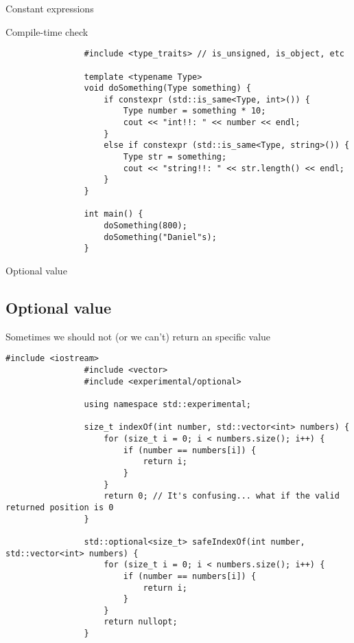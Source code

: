 \documentclass{beamer}
\newcommand{\normalSizeItem}[1] {
  \normalsize{\item #1}
}
\begin{document}
		\begin{frame}[fragile]{Constant expressions }	
			\begin{itemize}
				\normalSizeItem { Compile-time check }
				\begin{lstlisting}
				#include <type_traits> // is_unsigned, is_object, etc
				
				template <typename Type>
				void doSomething(Type something) {	
					if constexpr (std::is_same<Type, int>()) {
						Type number = something * 10;
						cout << "int!!: " << number << endl;
					}
					else if constexpr (std::is_same<Type, string>()) {
						Type str = something;
						cout << "string!!: " << str.length() << endl;
					}
				}
	
				int main() {
					doSomething(800);
					doSomething("Daniel"s);
				}
				\end{lstlisting}
			\end{itemize}
		\end{frame}
		
		\begin{frame}[fragile]{Optional value}	
			\subsection{Optional value}
			\begin{itemize}
				\normalSizeItem { Sometimes we should not (or we can't) return an specific value }
				\begin{lstlisting}[basicstyle={\tiny\ttfamily}]
				#include <iostream>
				#include <vector>
				#include <experimental/optional>
				
				using namespace std::experimental;
				
				size_t indexOf(int number, std::vector<int> numbers) {
					for (size_t i = 0; i < numbers.size(); i++) {
						if (number == numbers[i]) { 
							return i; 	
						}
					}
					return 0; // It's confusing... what if the valid returned position is 0
				}
				
				std::optional<size_t> safeIndexOf(int number, std::vector<int> numbers) {
					for (size_t i = 0; i < numbers.size(); i++) {
						if (number == numbers[i]) {
							return i;
						}
					}
					return nullopt;
				}
				\end{lstlisting}
			\end{itemize}
		\end{frame}
		
\end{document}
